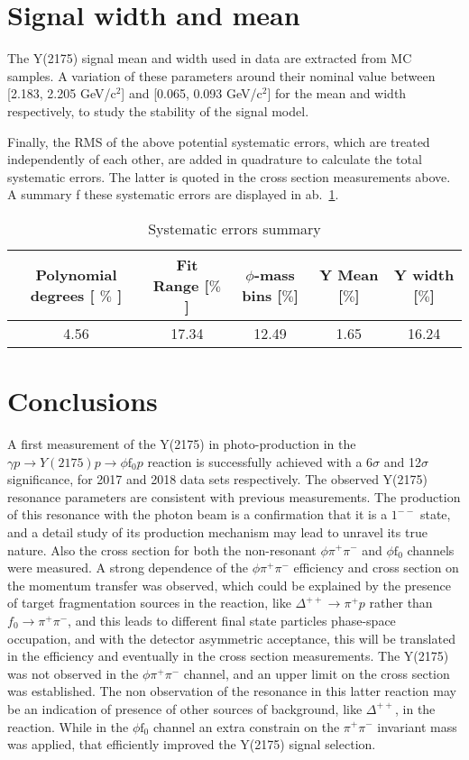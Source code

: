 \section{Signal width and mean}

The Y(2175) signal mean and width used in data are extracted from MC samples. A variation of these parameters around their nominal value between [2.183, 2.205 GeV/c$^2$] and [0.065, 0.093 GeV/c$^2$] for the mean and width respectively, to study the stability of the signal model.

Finally, the RMS of the above potential systematic errors, which are treated independently of each other, are added in quadrature to calculate the total systematic errors. The latter is quoted in the cross section measurements above. A summary f these systematic errors are displayed in ab.~\ref{tab.4.6}.

\begin{table}[!htbp]
    \centering
    \caption{Systematic errors summary}
    \label{tab.4.6}
    \begin{tabular}{|c|c|c|c|c|}
        \hline
        Polynomial degrees [ $\%$ ] & Fit Range [$\%$] & $\phi$-mass bins [$\%$]  & Y Mean [$\%$] & Y width [$\%$] \\
        \hline
        4.56 & 17.34 & 12.49 & 1.65 & 16.24 \\
        \hline
    \end{tabular}
\end{table}

\section{Conclusions}
\label{chap.syserr.conc}

A first measurement of the Y(2175) in photo-production in the $\gamma p \rightarrow Y(2175) p \rightarrow \phi \mathrm{f}_0 p$ reaction is successfully achieved with a 6$\sigma$ and 12$\sigma$ significance, for 2017 and 2018 data sets respectively. The observed Y(2175) resonance parameters are consistent with previous measurements. The production of this resonance with the photon beam is a confirmation that it is a $1^{--}$ state, and a detail study of its production mechanism may lead to unravel its true nature. Also the cross section for both the non-resonant $\phi \pi^+\pi^-$ and $\phi \mathrm{f}_0$ channels were measured. A strong dependence of the $\phi \pi^+\pi^-$ efficiency and cross section on the momentum transfer was observed, which could be explained by the presence of target fragmentation sources in the reaction, like $\Delta^{++} \rightarrow \pi^+ p$ rather than ${f}_0 \rightarrow \pi^+\pi^-$, and this leads to different final state particles phase-space occupation, and with the detector asymmetric acceptance, this will be translated in the efficiency and eventually in the cross section measurements. The Y(2175) was not observed in the $\phi \pi^+\pi^-$ channel, and an upper limit on the cross section was established. The non observation of the resonance in this latter reaction may be an indication of presence of other sources of background, like $\Delta^{++}$, in the reaction. While in the $\phi \mathrm{f}_0$ channel an extra constrain on the $\pi^+\pi^-$ invariant mass was applied, that efficiently improved the Y(2175) signal selection.
